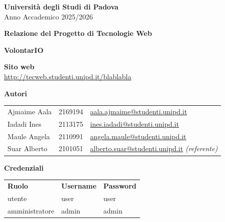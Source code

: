 \documentclass[a4paper,11pt]{article}
\begin{document}
\begin{titlepage}
    \centering

    \vspace{1cm}
    
    {\Large \textbf{Università degli Studi di Padova}} \\
    \vspace{0.5cm}
    {\large Anno Accademico 2025/2026}
    \vspace{1.5cm}
    
    {\Large \textbf{Relazione del Progetto di Tecnologie Web}} \\
    \vspace{2cm}
    
    {\Huge \textbf{VolontarIO}} \\
    \vspace{1.5cm}
    
    \large\textbf{Sito web}\\
    \url{http://tecweb.studenti.unipd.it/blablabla}
    \begin{table}[h!]
        \centering
        \large
        \vspace{1cm}
        \textbf{Autori}\\
        \vspace{0.5cm}
        \begin{tabular}{l l l}
            Ajmaime Aala & 2169194 & \href{mailto:aala.ajmaime@studenti.unipd.it}{aala.ajmaime@studenti.unipd.it} \\
            Iadadi Ines & 2113175 & \href{mailto:ines.iadadi@studenti.unipd.it}{ines.iadadi@studenti.unipd.it} \\
            Maule Angela & 2110991 & \href{mailto:angela.maule@studenti.unipd.it}{angela.maule@studenti.unipd.it} \\
            Suar Alberto & 2101051 & \href{mailto:alberto.suar@studenti.unipd.it}{alberto.suar@studenti.unipd.it} \textit{(referente)}\\ 
        \end{tabular}
    \end{table}

    \vspace{1cm}
    \begin{table}[h!]
        \centering
        \large
        \textbf{Credenziali}\\
        \vspace{0.5cm}
        \begin{tabular}{l l l}
            \textbf{Ruolo} & \textbf{Username} & \textbf{Password} \\
            utente & user & user\\
            amministratore & admin & admin\\
        \end{tabular}
    \end{table}
    \vfill  
\end{titlepage}
\end{document}
